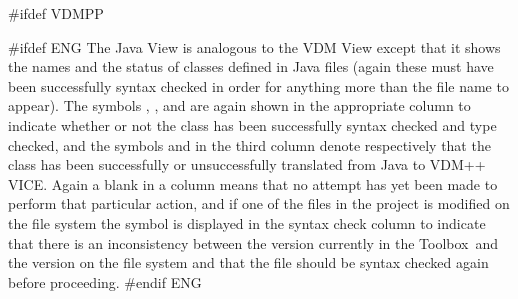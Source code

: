 \documentclass[\pformat,12pt]{article}
\newcommand{\vdmslpp}{VDM-SL}
\newcommand{\Toolbox}{Toolbox}
\newcommand{\vdmslpp}{VDM++}
\newcommand{\Toolbox}{Toolbox}
\renewcommand{\vdmslpp}{VDM++ VICE}
\newcommand{\guicmd}[1]{{\sf #1}}
\newcommand{\guicmd}[1]{{\gt #1}}
\begin{document}
#ifdef VDMPP

#ifdef ENG
The \guicmd{Java View} is analogous to the \guicmd{VDM View} except
that it shows the names and the status of classes defined in Java
files (again these must have been successfully syntax checked in order
for anything more than the file name to appear). The
symbols 
,
,
 and
are again shown in the appropriate column to indicate whether or not
the class has been successfully syntax checked and type checked, and
the symbols 
and
in the third column denote respectively that the class has been
successfully or unsuccessfully translated from Java to \vdmslpp.
Again a blank in a column means that no attempt has yet been made to
perform that particular action, and if one of the files in the project
is modified on the file system the symbol
is displayed in the \guicmd{syntax check} column  to indicate
that there is an inconsistency between the version currently in the \Toolbox\ and the
version on the file system and that the file should be syntax checked
again before proceeding.
#endif ENG
\end{document}
